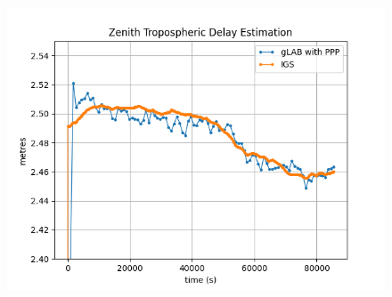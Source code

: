 \begin{figure}[H]
        \centering
        \includegraphics[scale=0.52]{sources/Figures/FIG_2/TUT2_Ex1b.png}
        \caption{}
        \label{fig:}
\end{figure}

